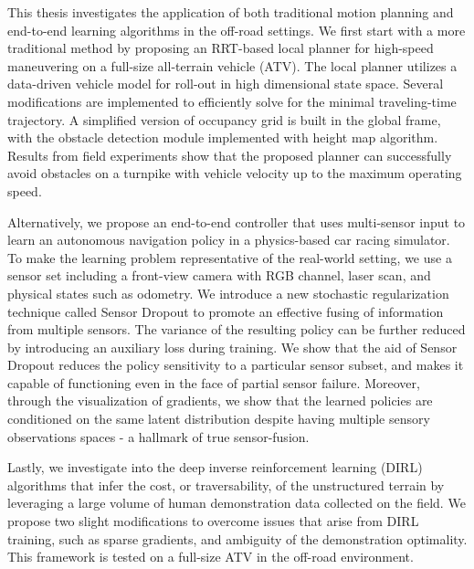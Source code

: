 \documentclass[../thesis.tex]{subfiles}
\begin{document}

This thesis investigates the application of both traditional motion planning and end-to-end learning algorithms in the off-road settings.
We first start with a more traditional method by proposing an RRT-based local planner for high-speed maneuvering on a full-size all-terrain vehicle (ATV). 
The local planner utilizes a data-driven vehicle model for roll-out in high dimensional state space. 
Several modifications are implemented to efficiently solve for the minimal traveling-time trajectory.
A simplified version of occupancy grid is built in the global frame, with the obstacle detection module implemented with height map algorithm.
Results from field experiments show that the proposed planner can successfully avoid obstacles on a turnpike with vehicle velocity up to the maximum operating speed.

Alternatively, we propose an end-to-end controller that uses multi-sensor input to learn an autonomous navigation policy in a physics-based car racing simulator.
To make the learning problem representative of the real-world setting, we use a sensor set including a front-view camera with RGB channel, laser scan, and physical states such as odometry. 
We introduce a new stochastic regularization technique called Sensor Dropout to promote an effective fusing of information from multiple sensors. 
The variance of the resulting policy can be further reduced by introducing an auxiliary loss during training. 
We show that the aid of Sensor Dropout reduces the policy sensitivity to a particular sensor subset, and makes it capable of functioning even in the face of partial sensor failure. 
Moreover, through the visualization of gradients, we show that the learned policies are conditioned on the same latent distribution despite having multiple sensory observations spaces - a hallmark of true sensor-fusion. 

Lastly, we investigate into the deep inverse reinforcement learning (DIRL) algorithms that infer the cost, or traversability, of the unstructured terrain by leveraging a large volume of human demonstration data collected on the field. 
We propose two slight modifications to overcome issues that arise from DIRL training, such as sparse gradients, and ambiguity of the demonstration optimality.
This framework is tested on a full-size ATV in the off-road environment.
\end{document}
